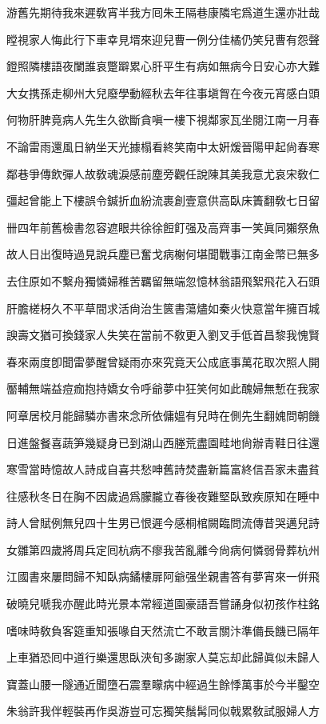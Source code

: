 \documentclass{zhvt-classic-Miya}
\begin{document}
游舊先期待我來遲敎宵半我方囘朱王隔巷康隣宅爲道生還亦壯哉

瞠視家人悔此行下車幸見壻來迎兒曹一例分佳橘仍笑兒曹有怨聲

鐙照隣樓語夜闌誰哀蹩躃累心肝平生有病如無病今日安心亦大難

大女携孫走柳州大兒廢學動經秋去年往事塡胷在今夜元宵感白頭

何物肝脾竟病人先生久欲斷貪嗔一樓下視鄰家瓦坐閱江南一月春

不論雷雨還風日納坐天光據榻看終笑南中太姸煖晉陽甲起尙春寒

鄰巷爭傳飲彈人故敎魂淚感前塵旁觀任說陳其美我意尤哀宋敎仁

彊起曾能上下樓誤令鍼折血紛流裹創壹意供高臥床簀翻敎七日留

卌四年前舊檢書忽容遮眼共徐徐餖飣强及高齊事一笑眞同獺祭魚

故人日出復時過見說兵塵已奮戈病榭何堪聞戰事江南金幣已無多

去住原如不繫舟獨憐婦稚苦羈留無端忽憶林翁語飛絮飛花入石頭

肝膽槎枒久不平草間求活尙治生篋書蕩燼如秦火快意當年擁百城

諛壽文猶可換錢家人失笑在當前不敎更入劉叉手低首昌黎我愧賢

春來兩度卽聞雷夢醒曾疑雨亦來究竟天公成底事萬花取次照人開

靨輔無端益痘痂抱持嬌女令呼爺夢中狂笑何如此醜婦無慙在我家

阿章居校月能歸驎亦書來念所依傭媼有兒時在側先生翻媿問朝饑

日進盤餐喜蔬笋幾疑身已到湖山西塍荒盡園畦地尙辦青鞋日往還

寒雪當時憶故人詩成自喜共愁呻舊詩焚盡新篇富終信吾家未盡貧

往感秋冬日在胸不因歲過爲朦朧立春後夜難堅臥致疾原知在睡中

詩人曾賦例無兒四十生男已恨遲今感桐棺闕臨問流傳昔哭邁兒詩

女雛第四歲將周兵定囘杭病不瘳我苦亂離今尙病何憐弱骨葬杭州

江國書來屢問歸不知臥病鐍樓扉阿爺强坐親書答有夢宵來一倂飛

破曉兒嗁我亦醒此時光景本常經道園豪語吾嘗誦身似初孩作柱銘

嗜味時敎負客筵重知張喙自天然流亡不敢言關汴準備長饑已隔年

上車猶恐囘中道行樂還思臥浹旬多謝家人莫忘却此歸眞似未歸人

寶蓋山腰一隧通近聞墮石震羣矇病中經過生餘悸萬事於今半鑿空

朱翁許我伴輕裝再作吳游豈可忘獨笑鬚髯同似戟累敎試服婦人方
\end{document}
